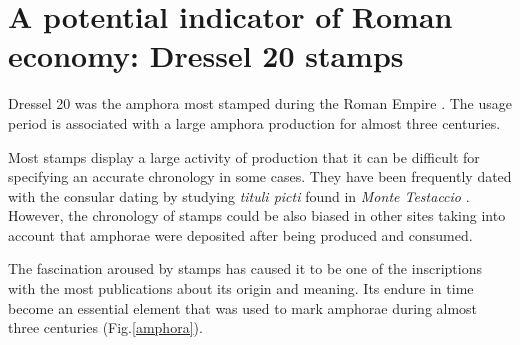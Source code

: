 \documentclass[review]{elsarticle}
\newcommand{\memo}[2]{\textcolor{#1}{#2}}
\newcommand{\xavi}[1]{\memo{magenta}{XRC: #1\\}}
\begin{document}


 

\section{A potential indicator of Roman economy: Dressel 20 stamps}

Dressel 20 was the amphora most stamped during the Roman Empire \citep[18]{millet_anforas_1998}. The usage period is associated with a large amphora production for almost three centuries. 

Most stamps display a large activity of production that it can be difficult for specifying an accurate chronology in some cases. They have been frequently dated with the consular dating by studying \textit{tituli picti} found in \textit{Monte Testaccio} \citep{Testaccio1, berni_millet_epigrafianforica_2008}.
However, the chronology of stamps could be also biased in other sites taking into account that amphorae were deposited after being produced and consumed.  


The fascination aroused by stamps has caused it to be one of the inscriptions with the most publications about its origin and meaning. Its endure in time become an essential element that was used to mark amphorae during almost three centuries \citep{remesal_sellar_2016} (Fig.\ref{amphora}). 
\end{document}
